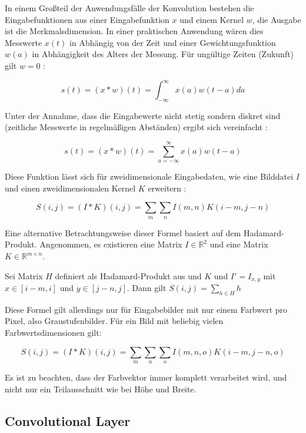 In einem Großteil der Anwendungsfälle der Konvolution bestehen die Eingabefunktionen aus einer Eingabefunktion $x$ und einem Kernel $w$, die Ausgabe ist die Merkmalsdimension. In einer praktischen Anwendung wären dies \bspw Messwerte $x(t)$ in Abhängig von der Zeit und einer Gewichtungsfunktion $w(a)$ in Abhängigkeit des Alters der Messung. Für ungültige Zeiten (\bspw Zukunft) gilt $w=0$ \cite[Kap.~9]{deeplearning_16}:

\begin{equation}
s(t) = (x*w)(t) = \int_{-\infty}^{\infty} x(a)w(t-a)da
\end{equation}

Unter der Annahme, dass die Eingabewerte nicht stetig sondern diskret sind (\bspw zeitliche Messwerte in regelmäßigen Abständen) ergibt sich vereinfacht \cite[Kap.~9]{deeplearning_16}:

\begin{equation}
s(t) = (x*w)(t) = \sum_{a=-\infty}^{\infty}x(a)w(t-a)
\end{equation}

Diese Funktion lässt sich für zweidimensionale Eingabedaten, wie \zB eine Bilddatei $I$ und einen zweidimensionalen Kernel $K$ erweitern \cite[Kap.~9]{deeplearning_16}:

\begin{equation}
S(i,j) = (I*K)(i,j) = \sum_{m}\sum_{n}I(m,n)K(i-m,j-n)
\end{equation}

Eine alternative Betrachtungsweise dieser Formel basiert auf dem Hadamard-Produkt. Angenommen, es existieren eine Matrix $I\in\mathbb{R}^{2}$ und eine Matrix $K\in\mathbb{R}^{m\times n}$.

Sei Matrix $H$ definiert als Hadamard-Produkt aus und $K$ und $I'=I_{x, y}$ mit $x\in[i-m,i]$ und $y\in[j-n,j]$.
Dann gilt $S(i,j)=\sum_{h\in H}h$

Diese Formel gilt allerdings nur für Eingabebilder mit nur einem Farbwert pro Pixel, also Graustufenbilder. Für ein Bild mit beliebig vielen Farbwertsdimensionen gilt:

\begin{equation}
S(i,j) = (I*K)(i,j) = \sum_{m}\sum_{n}\sum_{o}I(m,n,o)K(i-m,j-n,o)
\end{equation}

Es ist zu beachten, dass der Farbvektor immer komplett verarbeitet wird, und nicht nur ein Teilausschnitt wie bei Höhe und Breite.

\subsection{Convolutional Layer}
\label{ssec:convlayer}

